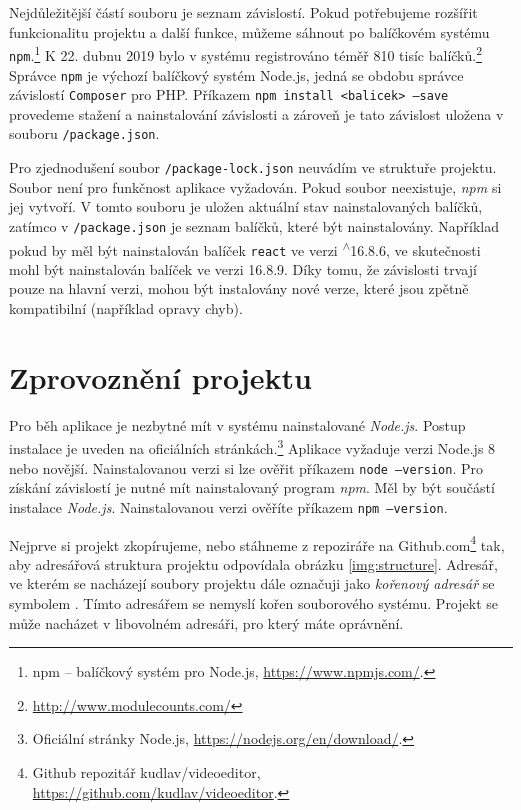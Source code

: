 Nejdůležitější částí souboru je seznam závislostí. Pokud potřebujeme rozšířit funkcionalitu projektu a další funkce, můžeme sáhnout po balíčkovém systému \texttt{npm}.\footnote{npm -- balíčkový systém pro Node.js, \url{https://www.npmjs.com/}.} K 22. dubnu 2019 bylo v systému registrováno téměř 810 tisíc balíčků.\footnote{\url{http://www.modulecounts.com/}} Správce \texttt{npm} je výchozí balíčkový systém Node.js, jedná se obdobu správce závislostí \texttt{Composer} pro PHP. Příkazem \texttt{npm install <balicek> --save} provedeme stažení a nainstalování závislosti a zároveň je tato závislost uložena v souboru \texttt{/package.json}.

Pro zjednodušení soubor \texttt{/package-lock.json} neuvádím ve struktuře projektu. Soubor není pro funkčnost aplikace vyžadován. Pokud soubor neexistuje, \textit{npm} si jej vytvoří. V tomto souboru je uložen aktuální stav nainstalovaných balíčků, zatímco v \texttt{/package.json} je seznam balíčků, které  být nainstalovány. Například pokud by měl být nainstalován balíček \texttt{react} ve verzi \textsuperscript{$\wedge$}16.8.6, ve skutečnosti mohl být nainstalován balíček ve verzi 16.8.9. Díky tomu, že závislosti trvají pouze na hlavní verzi, mohou být instalovány nové verze, které jsou zpětně kompatibilní (například opravy chyb).

\section{Zprovoznění projektu}
Pro běh aplikace je nezbytné mít v systému nainstalované \textit{Node.js}. Postup instalace je uveden na oficiálních stránkách.\footnote{Oficiální stránky Node.js, \url{https://nodejs.org/en/download/}.} Aplikace vyžaduje verzi Node.js 8 nebo novější. Nainstalovanou verzi si lze ověřit příkazem \texttt{node --version}. Pro získání závislostí je nutné mít nainstalovaný program \textit{npm}. Měl by být součástí instalace \textit{Node.js}. Nainstalovanou verzi ověříte příkazem \texttt{npm --version}.

Nejprve si projekt zkopírujeme, nebo stáhneme z repoziráře na Github.com\footnote{Github repozitář kudlav/videoeditor, \url{https://github.com/kudlav/videoeditor}.} tak, aby adresářová struktura projektu odpovídala obrázku \ref{img:structure}. Adresář, ve kterém se nacházejí soubory projektu dále označuji jako \textit{kořenový adresář} se symbolem \uv{/}. Tímto adresářem se nemyslí kořen souborového systému. Projekt se může nacházet v libovolném adresáři, pro který máte oprávnění.

